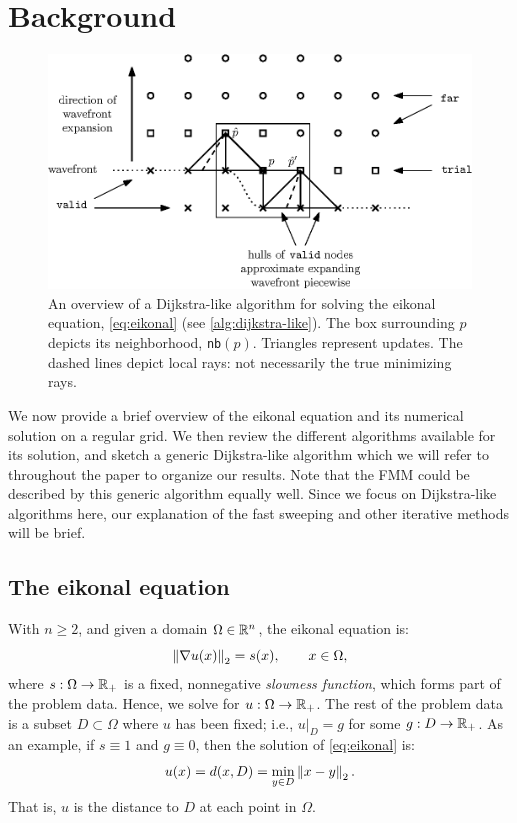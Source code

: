 \documentclass[eikonal.tex]{subfiles}
\begin{document}
\section{Background}\label{sec:background}

\begin{figure}[t]
  \centering
  \includegraphics{overview.eps}
  \caption{An overview of a Dijkstra-like algorithm for solving the
    eikonal equation, \cref{eq:eikonal} (see
    \cref{alg:dijkstra-like}). The box surrounding $p$ depicts its
    neighborhood, \texttt{nb}$(p)$. Triangles represent updates. The
    dashed lines depict local rays: not necessarily the true
    minimizing rays.}
  \label{fig:overview}
\end{figure}

We now provide a brief overview of the eikonal equation and its
numerical solution on a regular grid. We then review the different
algorithms available for its solution, and sketch a generic
Dijkstra-like algorithm which we will refer to throughout the paper to
organize our results. Note that the FMM could be described by this
generic algorithm equally well. Since we focus on Dijkstra-like
algorithms here, our explanation of the fast sweeping and other
iterative methods will be brief.

\subsection{The eikonal equation}

With $n \geq 2$, and given a domain $\Omega \in \mathbb{R}^n$, the eikonal
equation is:
\begin{equation}\label{eq:eikonal}
  \norm{\nabla u(x)}_2 = s(x), \qquad x \in \Omega,
\end{equation}
where $s : \Omega \to \mathbb{R}_+$ is a fixed, nonnegative \emph{slowness
  function}, which forms part of the problem data. Hence, we solve for
$u : \Omega \to \mathbb{R}_+$. The rest of the problem data is a
subset $D \subset \Omega$ where $u$ has been fixed; i.e.,
$\left. u \right|_D = g$ for some $g : D \to \mathbb{R}_+$. As an
example, if $s \equiv 1$ and $g \equiv 0$, then the solution of
\cref{eq:eikonal} is:
\begin{equation}
  \label{eq:distance-to-Omega}
  u(x) = d(x, D) = \min_{y \in D} \norm{x - y}_2.
\end{equation}
That is, $u$ is the distance to $D$ at each point in
$\Omega$. 
\end{document}
